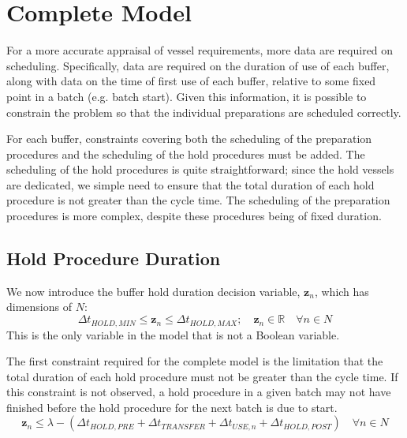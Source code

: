 \section{Complete Model}\label{S.prepsched}

For a more accurate appraisal of vessel requirements, more data are required
on scheduling.
Specifically, data are required on the duration of use of each buffer, along
with data on the time of first use of each buffer, relative to some fixed point
in a batch (e.g. batch start).
Given this information, it is possible to constrain the problem so that the
individual preparations are scheduled correctly.

For each buffer, constraints covering both the scheduling of the preparation
procedures and the scheduling of the hold procedures must be added.
The scheduling of the hold procedures is quite straightforward; since the hold
vessels are dedicated, we simple need to ensure that the total duration of each
hold procedure is not greater than the cycle time.
The scheduling of the preparation procedures is more complex, despite these
procedures being of fixed duration.

\subsection{Hold Procedure Duration}\label{SS.constr5}

We now introduce the buffer hold duration decision variable, 
$\boldsymbol{z}_{n}$, which has dimensions of $N$:
\begin{equation}
    \Delta t_{\mathit{HOLD,MIN}} \le \boldsymbol{z}_{n} \le 
    \Delta t_{\mathit{HOLD,MAX}}; \quad
    \boldsymbol{z}_{n} \in \mathbb{R} \quad \forall n \in N
    \label{eq.z}
\end{equation}
This is the only variable in the model that is not a Boolean variable.

The first constraint required for the complete model is the limitation that the
total duration of each hold procedure must not be greater than the cycle time.
If this constraint is not observed, a hold procedure in a given batch may not
have finished before the hold procedure for the next batch is due to start.
\begin{equation}
    \boldsymbol{z}_{n} \le \lambda - \left( \Delta t_{\mathit{HOLD,PRE}} +
    \Delta t_{\mathit{TRANSFER}} + \Delta t_{\mathit{USE},n} + \Delta
    t_{\mathit{HOLD,POST}} \right) \quad \forall n \in N
    \label{eq.constr5}
\end{equation}

